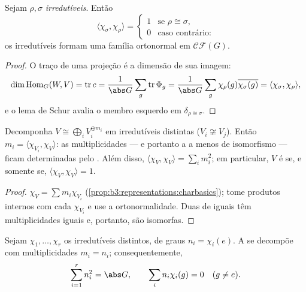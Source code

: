 \begin{theorem}
\label{thm:b3:representations:orthogonality}
Sejam $\rho, \sigma$ \emph{irredutíveis}. Então
\[
\langle\chi_\sigma, \chi_\rho\rangle =
\begin{cases}
1 & \text{se } \rho \cong \sigma,\\
0 & \text{caso contrário:}
\end{cases}
\]
os  irredutíveis formam uma família ortonormal em $\mathcal{CF}(G)$.
\end{theorem}

\begin{proof}
O traço de uma projeção é a dimensão de sua imagem:
\[
\dim\operatorname{Hom}_G(W, V) = \operatorname{tr} c
= \frac1{\abs G}\sum_g \operatorname{tr}\Phi_g
= \frac1{\abs G}\sum_g \chi_\rho(g)\overline{\chi_\sigma(g)}
= \langle \chi_\sigma, \chi_\rho\rangle,
\]
e o lema de Schur avalia o membro esquerdo em $\delta_{\rho \cong
\sigma}$.
\end{proof}

\begin{corollary}\label{cor:b3:representations:multiplicity}
Decomponha $V \cong \bigoplus_i V_i^{\oplus m_i}$ em irredutíveis distintas ($V_i \not\cong V_j$). Então $m_i = \langle
\chi_{V_i}, \chi_V\rangle$: as
multiplicidades --- e portanto a  a menos de isomorfismo
--- ficam determinadas pelo . Além disso, $\langle \chi_V, \chi_V\rangle = \sum_i
m_i^2$; em particular,
$V$ é  se, e somente se, $\langle\chi_V,
\chi_V\rangle = 1$.
\end{corollary}

\begin{proof}
$\chi_V = \sum m_i\chi_{V_i}$ (\cref{prop:b3:representations:charbasics}); tome produtos internos com cada $\chi_{V_i}$ e use a
ortonormalidade. Duas  de  iguais têm
multiplicidades iguais e, portanto, são isomorfas.
\end{proof}

\begin{theorem}
\label{thm:b3:representations:regular}
Sejam $\chi_1, \dots, \chi_r$ os  irredutíveis distintos, de graus $n_i = \chi_i(e)$. A
 se decompõe com multiplicidades $m_i = n_i$;
consequentemente,
\[
\sum_{i=1}^{r} n_i^2 = \abs G,
\qquad
\sum_i n_i\chi_i(g) = 0 \quad (g \neq e).
\]
\end{theorem}

